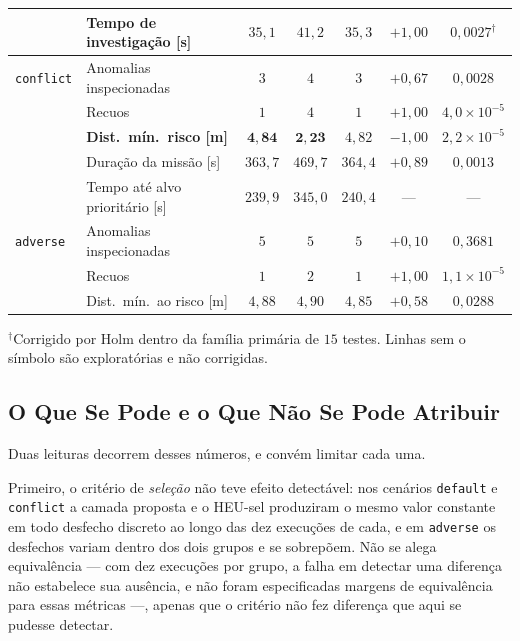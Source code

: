 \begin{table}[htb]
\begin{tabular}{llccccc}
                 & Tempo de investigação [s]  & $35{,}1$  & $41{,}2$  & $35{,}3$  & $+1{,}00$ & $0{,}0027^{\dagger}$\\
\hline
\texttt{conflict} & Anomalias inspecionadas   & $3$     & $4$     & $3$     & $+0{,}67$ & $0{,}0028$\\
                 & Recuos                     & $1$     & $4$     & $1$     & $+1{,}00$ & $4{,}0\times10^{-5}$\\
                 & \textbf{Dist.\ mín.\ risco [m]} & $\mathbf{4{,}84}$ & $\mathbf{2{,}23}$ & $4{,}82$ & $-1{,}00$ & $2{,}2\times10^{-5}$\\
                 & Duração da missão [s]      & $363{,}7$ & $469{,}7$ & $364{,}4$ & $+0{,}89$ & $0{,}0013$\\
                 & Tempo até alvo prioritário [s]& $239{,}9$ & $345{,}0$ & $240{,}4$ & ---     & ---\\
\hline
\texttt{adverse} & Anomalias inspecionadas    & $5$     & $5$     & $5$     & $+0{,}10$ & $0{,}3681$\\
                 & Recuos                     & $1$     & $2$     & $1$     & $+1{,}00$ & $1{,}1\times10^{-5}$\\
                 & Dist.\ mín.\ ao risco [m]  & $4{,}88$  & $4{,}90$  & $4{,}85$  & $+0{,}58$ & $0{,}0288$\\
\hline
\end{tabular}

\vspace{2pt}
\footnotesize $^{\dagger}$Corrigido por Holm dentro da família primária de $15$
testes. Linhas sem o símbolo são exploratórias e não corrigidas.
\end{table}

\subsection{O Que Se Pode e o Que Não Se Pode Atribuir}

Duas leituras decorrem desses números, e convém limitar cada uma.

Primeiro, o critério de \emph{seleção} não teve efeito detectável: nos cenários
\texttt{default} e \texttt{conflict} a camada proposta e o HEU-sel produziram o mesmo
valor constante em todo desfecho discreto ao longo das dez execuções de cada, e em
\texttt{adverse} os desfechos variam dentro dos dois grupos e se sobrepõem. Não se
alega equivalência --- com dez execuções por grupo, a falha em detectar uma diferença
não estabelece sua ausência, e não foram especificadas margens de equivalência para
essas métricas ---, apenas que o critério não fez diferença que aqui se pudesse
detectar.

